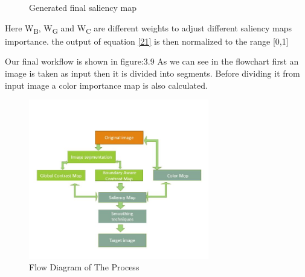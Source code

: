 \begin{figure}[here]%
    \centering
    \qquad
    \caption{Generated final saliency map}%
    \label{superpixel}%
\end{figure}
\noindent
Here W\textsubscript{B}, W\textsubscript{G} and W\textsubscript{C} are different weights to adjust different saliency maps importance.
the output of equation \eqref{21} is then normalized to the range [0,1]

Our final workflow is shown in figure:3.9 
As we can see in the flowchart first an image is taken as input then it is divided into segments. Before dividing it from input image a color importance map is also calculated.
\begin{figure}[here]
  \centering
  \includegraphics[width=0.7\textwidth,height=0.9\textwidth]{pictures/flowchart.jpg}
  \caption{Flow Diagram of The Process}
  \label{orangeleaf}
\end{figure}

